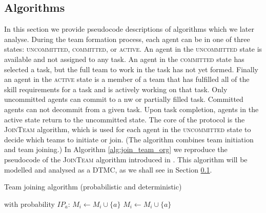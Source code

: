 \documentclass{llncs}
\newcommand{\comment}[1]{{\color{red}{[\sf #1]}}}
\begin{document}
\subsection{Algorithms}

\comment{TL: shall we say something about the whole protocol to give the readers a general picture?}

In this section we provide pseudocode descriptions of algorithms which we later analyse. During the team formation process, each agent can be in one of three states: \textsc{uncommitted}, \textsc{committed}, or \textsc{active}. An agent in the \textsc{uncommitted}
state is available and not assigned to any task. An agent in the \textsc{committed} state has selected a task, but the full team to work in the task has not yet formed. Finally an agent in the  \textsc{active} state is a member of a team that has fulfilled all of the skill requirements for a task and is actively working on that task. Only uncommitted agents can commit to a nw or partially filled task. Committed agents can not decommit from a given task. Upon task completion, agents in the active state return to the uncommitted state. 
The core of the protocol is the \textsc{JoinTeam} algorithm, which is used for each agent in the \textsc{uncommitted}
state to decide which teams to initiate or join. (The algorithm combines team initiation and team joining.)
In Algorithm \ref{alg:join_team_org} we reproduce the pseudocode of the \textsc{JoinTeam} algorithm introduced in \cite{gaston2005agent}. %
This algorithm will be modelled and analysed as a DTMC, as we shall see in Section \ref{}.

\begin{algorithm}[H]
\caption{Team joining algorithm (probabilistic and deterministic)}
\label{alg:join_team_org}
\begin{scriptsize}
\begin{algorithmic}
     
       
	 
	  \State with probability $IP_a$: $M_i \leftarrow M_i \cup \{a\}$ 
	\EndIf
       
	 
	  \State $M_i \leftarrow M_i \cup \{a\}$ 
	\EndIf
      \EndIf
    \EndIf
  \EndFor
\EndProcedure
\end{algorithmic}
\end{scriptsize}
\end{algorithm}
\end{document}
